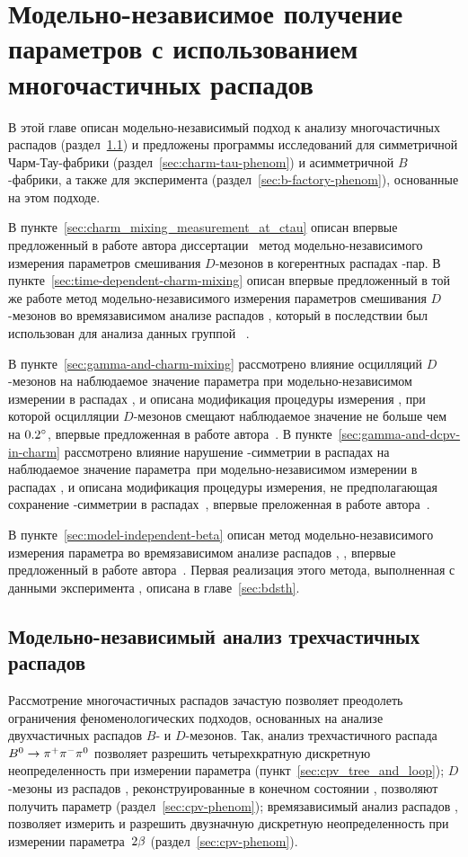 \chapter{Модельно-независимое получение параметров с использованием многочастичных распадов} \label{chapt2}
В этой главе описан модельно-независимый подход к анализу многочастичных распадов (раздел~\ref{sec:dalitz}) и предложены программы исследований для симметричной Чарм-Тау-фабрики (раздел~\ref{sec:charm-tau-phenom}) и асимметричной $B$-фабрики,  а также для эксперимента \lhcb (раздел~\ref{sec:b-factory-phenom}), основанные на этом подходе.  

В пункте~\ref{sec:charm_mixing_measurement_at_ctau} описан впервые предложенный в работе автора диссертации~\cite{mixing} метод модельно-независимого измерения параметров смешивания $D$-мезонов в когерентных распадах \ddbar-пар.  В пункте~\ref{sec:time-dependent-charm-mixing} описан впервые предложенный в той же работе метод модельно-независимого измерения параметров смешивания $D$-мезонов во времязависимом анализе распадов \dkpp, который в последствии был использован для анализа данных группой \lhcb~\cite{lhcb_dkspp_mixing}.  

В пункте~\ref{sec:gamma-and-charm-mixing} рассмотрено влияние осцилляций $D$-мезонов на наблюдаемое значение параметра \gphi при модельно-независимом измерении в распадах \bdk, \dkpp и описана модификация процедуры измерения \gphi, при которой осцилляции $D$-мезонов смещают наблюдаемое значение не больше чем на $0.2^{\circ}$, впервые предложенная в работе автора~\cite{mixing}.  
В пункте~\ref{sec:gamma-and-dcpv-in-charm} рассмотрено влияние нарушение \cpconj-симметрии в распадах \dnkpp на наблюдаемое значение параметра~\gphi при модельно-независимом измерении в распадах \bdk, \dkpp и описана модификация процедуры измерения, не предполагающая сохранение \cpconj-симметрии в распадах~\dnkpp, впервые преложенная в работе автора~\cite{bdpv_cpv}.  

В пункте~\ref{sec:model-independent-beta} описан метод модельно-независимого измерения параметра \pphi во времязависимом анализе распадов \bdsth, \dbkpp, впервые предложенный в работе автора~\cite{belle_beta_binned_dalitz}.  Первая реализация этого метода, выполненная с данными эксперимента \belle, описана в главе~\ref{sec:bdsth}.

\section{Модельно-независимый анализ трехчастичных распадов} \label{sec:dalitz}
Рассмотрение многочастичных распадов зачастую позволяет преодолеть ограничения феноменологических подходов, основанных на анализе двухчастичных распадов $B$- и $D$-мезонов.  Так, анализ трехчастичного распада $B^0\to\pi^+\pi^-\pi^0$ позволяет разрешить четырехкратную дискретную неопределенность при измерении параметра \aphi (пункт~\ref{sec:cpv_tree_and_loop});  $D$-мезоны из распадов \bdk, реконструированные в конечном состоянии \kspp, позволяют получить параметр \gphi (раздел~\ref{sec:cpv-phenom});  времязависимый анализ распадов \bdh, \dbkpp позволяет измерить \cosdbeta и разрешить двузначную дискретную неопределенность при измерении параметра~$2\beta$ (раздел~\ref{sec:cpv-phenom}).  

